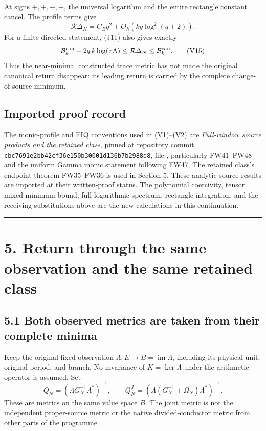 At signs \(+,+,-,-\), the universal logarithm and the entire rectangle constant cancel. The profile terms give \[
 \boxed{\mathcal R\Delta_N
 =C_Bq^2+O_h(kq\log^2(q+2)).} \tag{V14}
\] For a finite directed statement, (J11) also gives exactly \[
 \mathcal B_k^{\rm can}-2q\,k\log(\tau\Lambda)
 \le\mathcal R\Delta_N\le\mathcal B_k^{\rm can}. \tag{V15}
\] Thus the near-minimal constructed trace metric has not made the original canonical return disappear: its leading return is carried by the complete change-of-source minimum.

\subsection{Imported proof record}\label{imported-proof-record}

The monic-profile and EIQ conventions used in (V1)--(V2) are \emph{Full-window source products and the retained class}, pinned at repository commit \texttt{cbc7691e2bb42cf36e150b30001d136b7b2988d8}, file , particularly FW41--FW48 and the uniform Gamma monic statement following FW47. The retained class's endpoint theorem FW35--FW36 is used in Section 5. These analytic source results are imported at their written-proof status. The polynomial coercivity, tensor mixed-minimum bound, full logarithmic spectrum, rectangle integration, and the receiving substitutions above are the new calculations in this continuation.

\begin{center}\rule{0.5\linewidth}{0.5pt}\end{center}

\section{5. Return through the same observation and the same retained class}\label{return-through-the-same-observation-and-the-same-retained-class}

\subsection{5.1 Both observed metrics are taken from their complete minima}\label{both-observed-metrics-are-taken-from-their-complete-minima}

Keep the original fixed observation \(\Lambda:E\to B=\operatorname{im}\Lambda\), including its physical unit, original period, and branch. No invariance of \(K=\ker\Lambda\) under the arithmetic operator is assumed. Set \[
 Q_N=(\Lambda G_N^{-1}\Lambda^*)^{-1},\qquad
 Q_N^J=(\Lambda(G_N^{-1}+\Omega_N)\Lambda^*)^{-1}. \tag{O1}
\] These are metrics on the same value space \(B\). The joint metric is not the independent proper-source metric or the native divided-conductor metric from other parts of the programme.

